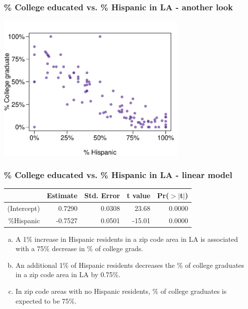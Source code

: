 
\begin{frame}
\frametitle{\% College educated vs. \% Hispanic in LA - another look}


\begin{center}
\includegraphics[width=0.7\textwidth]{8-4_inf_lin_reg/figures/la/la}
\end{center}

\end{frame}


\begin{frame}
\frametitle{\% College educated vs. \% Hispanic in LA - linear model}


{\small
\begin{center}
\begin{tabular}{rrrrr}
  \hline
 & Estimate & Std. Error & t value & Pr($>$$|$t$|$) \\ 
  \hline
(Intercept) & 0.7290 & 0.0308 & 23.68 & 0.0000 \\ 
 \%Hispanic & -0.7527 & 0.0501 & -15.01 & 0.0000 \\ 
   \hline
\end{tabular}
\end{center}
}

\begin{enumerate}[(a)]
\item A 1\% increase in Hispanic residents in a zip code area in LA is associated with a 75\% decrease in \% of college grads.
\item An additional 1\% of Hispanic residents decreases the \% of college graduates in a zip code area in LA by 0.75\%.
\item In zip code areas with no Hispanic residents, \% of college graduates is expected to be 75\%.
\end{enumerate}

\end{frame}

